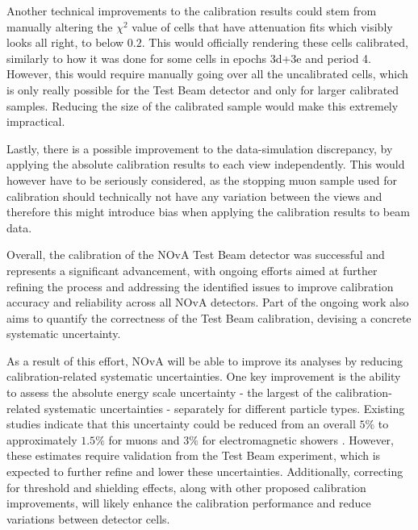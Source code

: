 Another technical improvements to the calibration results could stem from manually altering the $\chi^2$ value of cells that have attenuation fits which visibly looks all right, to below $0.2$. This would officially rendering these cells calibrated, similarly to how it was done for some cells in epochs 3d+3e and period 4. However, this would require manually going over all the uncalibrated cells, which is only really possible for the Test Beam detector and only for larger calibrated samples. Reducing the size of the calibrated sample would make this extremely impractical.


Lastly, there is a possible improvement to the data-simulation discrepancy, by applying the absolute calibration results to each view independently. This would however have to be seriously considered, as the stopping muon sample used for calibration should technically not have any variation between the views and therefore this might introduce bias when applying the calibration results to beam data.



Overall, the calibration of the \gls{NOvA} Test Beam detector was successful and represents a significant advancement, with ongoing efforts aimed at further refining the process and addressing the identified issues to improve calibration accuracy and reliability across all \gls{NOvA} detectors. Part of the ongoing work also aims to quantify the correctness of the Test Beam calibration, devising a concrete systematic uncertainty.

As a result of this effort, \gls{NOvA} will be able to improve its analyses by reducing calibration-related systematic uncertainties. One key improvement is the ability to assess the absolute energy scale uncertainty - the largest of the calibration-related systematic uncertainties - separately for different particle types. Existing studies indicate that this uncertainty could be reduced from an overall $5\%$ to approximately $1.5\%$ for muons and $3\%$ for electromagnetic showers \cite{NOVA-doc-53225}. However, these estimates require validation from the Test Beam experiment, which is expected to further refine and lower these uncertainties. Additionally, correcting for threshold and shielding effects, along with other proposed calibration improvements, will likely enhance the calibration performance and reduce variations between detector cells.

